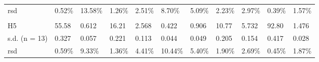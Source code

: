 \documentclass[final,authoryear,3p,times,twocolumn]{elsarticle}
\begin{document}
\begin{table}[htpb]
\begin{adjustbox}{max width=\textwidth}
\begin{tabular}{lllllllllll}
rsd           & 0.52\% & 13.58\% & 1.26\% & 2.51\% & 8.70\%  & 5.09\% & 2.23\% & 2.97\% & 0.39\% & 1.57\% \\
              &        &         &        &        &         &        &        &        &        &        \\
H5            & 55.58  & 0.612   & 16.21  & 2.568  & 0.422   & 0.906  & 10.77  & 5.732  & 92.80  & 1.476  \\
s.d. (n = 13) & 0.327  & 0.057   & 0.221  & 0.113  & 0.044   & 0.049  & 0.205  & 0.154  & 0.417  & 0.028  \\
rsd           & 0.59\% & 9.33\%  & 1.36\% & 4.41\% & 10.44\% & 5.40\% & 1.90\% & 2.69\% & 0.45\% & 1.87\%  \\ \midrule

\end{tabular}
\end{adjustbox}
\end{table}

\end{document}
